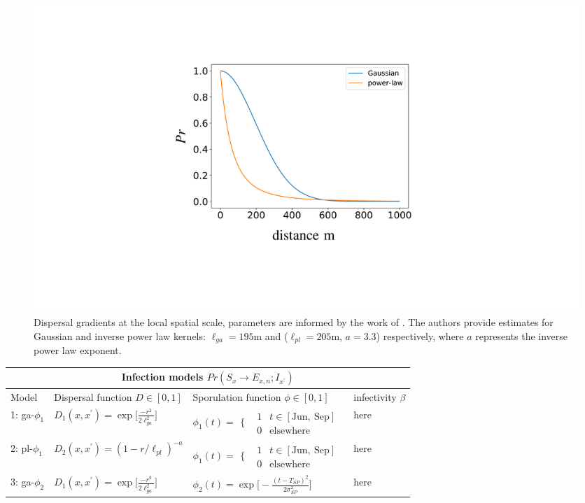 \begin{landscape}

\begin{figure}
    \centering
    \includegraphics[scale=0.20]{chapter6/figures/fig2.pdf}
    \caption{Dispersal gradients at the local spatial scale, parameters are informed by the work of \cite{grosdidier2018tracking}. The authors provide estimates for Gaussian and inverse power law kernels: $\ell_{ga} = 195\mathrm{m}$ and ($\ell_{pl} = 205\mathrm{m}$, $a=3.3$) respectively, where $a$ represents the inverse power law exponent.}
    \label{fig:dispersal-parameterisation}
\end{figure}

\centering
\begin{table}[]
\begin{tabular}{ | p{1.5cm} | p{5.0cm} | p{5.5cm} | p{3cm} | }
\hline
 \multicolumn{4}{|c|}{Infection models $Pr(S_{x} \rightarrow E_{x,n}; I_{x^{\prime}})$} \\
 \hline
 Model & Dispersal function $D \in [0, 1]$ & Sporulation function $ \phi \in [0, 1]$ & infectivity $\beta$ \\
 \hline
 1: ga-$\phi_1$ & $D_1(x, x^{\prime}) = \exp\Big[\frac{-r^2}{2\ell^2_{ga}}\Big]$ & $\phi_1(t) = 
\begin{array}{cc}
  \{ & 
    \begin{array}{cc}
      1 & t\in [\mathrm{Jun},\ \mathrm{Sep}] \\
      0 &  \mathrm{elsewhere}
    \end{array}
\end{array} $ & here\\
 2: pl-$\phi_1$ & $D_2(x, x^{\prime}) = (1 - r/\ell_{pl})^{-a}$ & $\phi_1(t) = 
\begin{array}{cc}
  \{ & 
    \begin{array}{cc}
      1 & t\in [\mathrm{Jun},\ \mathrm{Sep}] \\
      0 &  \mathrm{elsewhere}
    \end{array}
\end{array} $ & here\\
 3: ga-$\phi_2$ & $D_1(x, x^{\prime}) = \exp\Big[\frac{-r^2}{2\ell^2_{ga}}\Big]$ & $\phi_2(t) = \exp\Big[-\frac{(t - T_{SP})^2}{2\sigma_{SP}^2}\Big]$ & here\\


\end{tabular}
\end{table}
\end{landscape}
